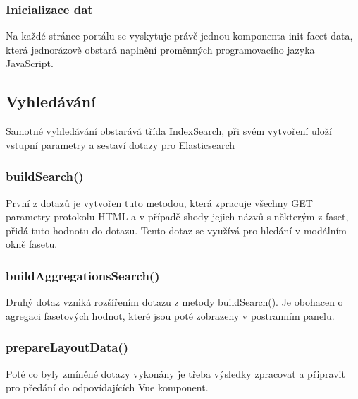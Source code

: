 \subsubsection*{Inicializace dat}
Na každé stránce portálu se vyskytuje právě jednou komponenta init-facet-data, která jednorázově obstará naplnění proměnných programovacího jazyka JavaScript.

\subsection{Vyhledávání}
Samotné vyhledávání obstarává třída IndexSearch, při svém vytvoření uloží vstupní parametry a sestaví dotazy pro Elasticsearch

\subsubsection*{buildSearch()}
První z dotazů je vytvořen tuto metodou, která zpracuje všechny GET parametry protokolu HTML a v případě shody jejich názvů s některým z faset, přidá tuto hodnotu do dotazu. Tento dotaz se využívá pro hledání v modálním okně fasetu. 

\subsubsection*{buildAggregationsSearch()}
Druhý dotaz vzniká rozšířením dotazu z metody buildSearch(). Je obohacen o agregaci fasetových hodnot, které jsou poté zobrazeny v postranním panelu.

\subsubsection*{prepareLayoutData()}
Poté co byly zmíněné dotazy vykonány je třeba výsledky zpracovat a připravit pro předání do odpovídajících Vue komponent. 
